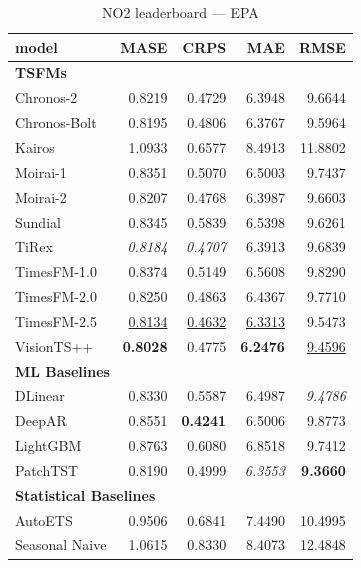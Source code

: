 \begin{table}[H]
\caption{NO2 leaderboard --- EPA}
\centering
\begin{small}
\begin{tabular}{lrrrr}
\toprule
model & MASE & CRPS & MAE & RMSE \\
\midrule
\multicolumn{5}{l}{\textbf{TSFMs}} \\
Chronos-2 & 0.8219 & 0.4729 & 6.3948 & 9.6644 \\
Chronos-Bolt & 0.8195 & 0.4806 & 6.3767 & 9.5964 \\
Kairos & 1.0933 & 0.6577 & 8.4913 & 11.8802 \\
Moirai-1 & 0.8351 & 0.5070 & 6.5003 & 9.7437 \\
Moirai-2 & 0.8207 & 0.4768 & 6.3987 & 9.6603 \\
Sundial & 0.8345 & 0.5839 & 6.5398 & 9.6261 \\
TiRex & \textit{0.8184} & \textit{0.4707} & 6.3913 & 9.6839 \\
TimesFM-1.0 & 0.8374 & 0.5149 & 6.5608 & 9.8290 \\
TimesFM-2.0 & 0.8250 & 0.4863 & 6.4367 & 9.7710 \\
TimesFM-2.5 & \underline{0.8134} & \underline{0.4632} & \underline{6.3313} & 9.5473 \\
VisionTS++ & \textbf{0.8028} & 0.4775 & \textbf{6.2476} & \underline{9.4596} \\
\midrule
\multicolumn{5}{l}{\textbf{ML Baselines}} \\
DLinear & 0.8330 & 0.5587 & 6.4987 & \textit{9.4786} \\
DeepAR & 0.8551 & \textbf{0.4241} & 6.5006 & 9.8773 \\
LightGBM & 0.8763 & 0.6080 & 6.8518 & 9.7412 \\
PatchTST & 0.8190 & 0.4999 & \textit{6.3553} & \textbf{9.3660} \\
\midrule
\multicolumn{5}{l}{\textbf{Statistical Baselines}} \\
AutoETS & 0.9506 & 0.6841 & 7.4490 & 10.4995 \\
Seasonal Naive & 1.0615 & 0.8330 & 8.4073 & 12.4848 \\
\bottomrule
\end{tabular}
\end{small}
\end{table}